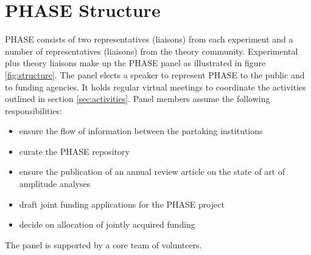 \section{PHASE Structure}
\label{sec:structure}
PHASE consists of two representatives (liaisons) from each experiment and a number of representatives (liaisons) from the theory community. Experimental plus theory liaisons make up the PHASE panel as illustrated in figure \ref{fig:structure}. The panel elects a speaker to represent PHASE to the public and to funding agencies. It holds regular virtual meetings to coordinate the activities outlined in section \ref{sec:activities}. Panel members assume the following responsibilities:
\begin{itemize}
\item ensure the flow of information between the partaking institutions
\item curate the PHASE repository
\item ensure the publication of an annual review article on the state of art of amplitude analyses
\item draft joint funding applications for the PHASE project
\item decide on allocation of jointly acquired funding
\end{itemize}

The panel is supported by a core team of volunteers.
